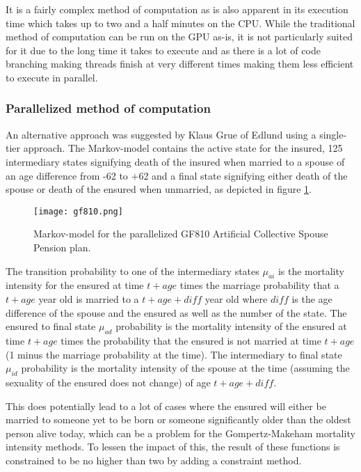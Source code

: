 It is a fairly complex method of computation as is also apparent in its execution time which takes up to two and a half minutes on the CPU.
While the traditional method of computation can be run on the GPU as-is, it is not particularly suited for it due to the long time it takes to execute and as there is a lot of code branching making threads finish at very different times making them less efficient to execute in parallel.

\subsubsection{Parallelized method of computation}\label{subsubsec:gf810parallelized}
An alternative approach was suggested by Klaus Grue of Edlund using a single-tier approach.
The Markov-model contains the active state for the insured, 125 intermediary states signifying death of the insured when married to a spouse of an age difference from -62 to +62 and a final state signifying either death of the spouse or death of the ensured when unmarried, as depicted in figure \ref{fig:gf810}.

\begin{figure}[h!]\centering
\texttt{[image: gf810.png]}
\caption{Markov-model for the parallelized GF810 Artificial Collective Spouse Pension plan.\label{fig:gf810}}
\end{figure}
\newcommand*{\diff}{\ensuremath{\mathit{diff}}}
The transition probability to one of the intermediary states $\mu_{ai}$ is the mortality intensity for the ensured at time $t + age$ times the marriage probability that a $t + age$ year old is married to a $t + age + \diff$ year old where $\diff$ is the age difference of the spouse and the ensured as well as the number of the state.
The ensured to final state $\mu_{ad}$ probability is the mortality intensity of the ensured at time $t + age$ times the probability that the ensured is not married at time $t + age$ (1 minus the marriage probability at the time).
The intermediary to final state $\mu_{id}$ probability is the mortality intensity of the spouse at the time (assuming the sexuality of the ensured does not change) of age $t + age + \diff$.

This does potentially lead to a lot of cases where the ensured will either be married to someone yet to be born or someone significantly older than the oldest person alive today, which can be a problem for the Gompertz-Makeham mortality intensity methods.
To lessen the impact of this, the result of these functions is constrained to be no higher than two by adding a constraint method.

